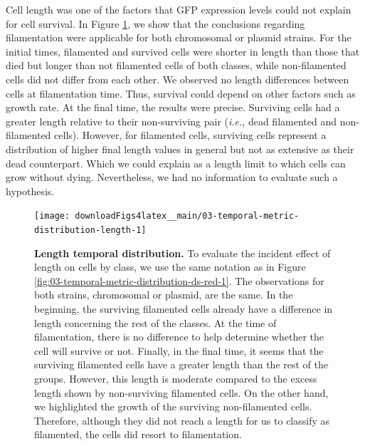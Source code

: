 \documentclass[a4paper, nobind]{templates/ociamthesis}
\begin{document}
Cell length was one of the factors that GFP expression levels could not explain for cell survival.
In Figure \ref{fig:03-temporal-metric-distribution-length-1}, we show that the conclusions regarding filamentation were applicable for both chromosomal or plasmid strains.
For the initial times, filamented and survived cells were shorter in length than those that died but longer than not filamented cells of both classes, while non-filamented cells did not differ from each other.
We observed no length differences between cells at filamentation time.
Thus, survival could depend on other factors such as growth rate.
At the final time, the results were precise.
Surviving cells had a greater length relative to their non-surviving pair (\emph{i.e.}, dead filamented and non-filamented cells).
However, for filamented cells, surviving cells represent a distribution of higher final length values in general but not as extensive as their dead counterpart.
Which we could explain as a length limit to which cells can grow without dying.
Nevertheless, we had no information to evaluate such a hypothesis.





\begin{figure}[H]
\texttt{[image: downloadFigs4latex\_\_main/03-temporal-metric-distribution-length-1]} \caption[Length temporal distribution.]{\textbf{Length temporal distribution.} To evaluate the incident effect of length on cells by class, we use the same notation as in Figure \ref{fig:03-temporal-metric-distribution-ds-red-1}. The observations for both strains, chromosomal or plasmid, are the same. In the beginning, the surviving filamented cells already have a difference in length concerning the rest of the classes. At the time of filamentation, there is no difference to help determine whether the cell will survive or not. Finally, in the final time, it seems that the surviving filamented cells have a greater length than the rest of the groups. However, this length is moderate compared to the excess length shown by non-surviving filamented cells. On the other hand, we highlighted the growth of the surviving non-filamented cells. Therefore, although they did not reach a length for us to classify as filamented, the cells did resort to filamentation.}\label{fig:03-temporal-metric-distribution-length-1}
\end{figure}
\end{document}
